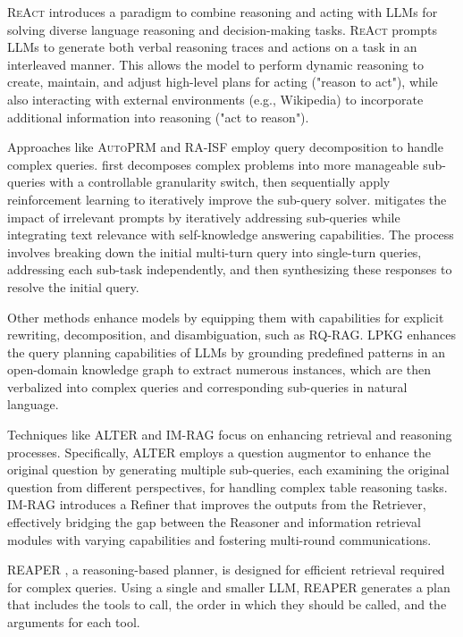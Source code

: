 \documentclass[11pt]{article}
\begin{document}
\textsc{ReAct} \cite{ReAct} introduces a paradigm to combine reasoning and acting with LLMs for solving diverse language reasoning and decision-making tasks. \textsc{ReAct} prompts LLMs to generate both verbal reasoning traces and actions on a task in an interleaved manner. This allows the model to perform dynamic reasoning to create, maintain, and adjust high-level plans for acting ("reason to act"), while also interacting with external environments (e.g., Wikipedia) to incorporate additional information into reasoning ("act to reason").

Approaches like \textsc{AutoPRM} \cite{AutoPRM} and \textsc{RA-ISF} \cite{RA-ISF} employ query decomposition to handle complex queries. \citet{AutoPRM} first decomposes complex problems into more manageable sub-queries with a controllable granularity switch, then sequentially apply reinforcement learning to iteratively improve the sub-query solver. \citet{RA-ISF} mitigates the impact of irrelevant prompts by iteratively addressing sub-queries while integrating text relevance with self-knowledge answering capabilities. The process involves breaking down the initial multi-turn query into single-turn queries, addressing each sub-task independently, and then synthesizing these responses to resolve the initial query.

Other methods enhance models by equipping them with capabilities for explicit rewriting, decomposition, and disambiguation, such as \textsc{RQ-RAG}. \textsc{LPKG} \cite{LPKG} enhances the query planning capabilities of LLMs by grounding predefined patterns in an open-domain knowledge graph to extract numerous instances, which are then verbalized into complex queries and corresponding sub-queries in natural language.

Techniques like \textsc{ALTER} \cite{ALTER} and \textsc{IM-RAG} \cite{IM-RAG} focus on enhancing retrieval and reasoning processes. Specifically, \textsc{ALTER} employs a question augmentor to enhance the original question by generating multiple sub-queries, each examining the original question from different perspectives, for handling complex table reasoning tasks. \textsc{IM-RAG} introduces a Refiner that improves the outputs from the Retriever, effectively bridging the gap between the Reasoner and information retrieval modules with varying capabilities and fostering multi-round communications.

\textsc{REAPER} \cite{REAPER}, a reasoning-based planner, is designed for efficient retrieval required for complex queries. Using a single and smaller LLM, REAPER generates a plan that includes the tools to call, the order in which they should be called, and the arguments for each tool.
\end{document}

